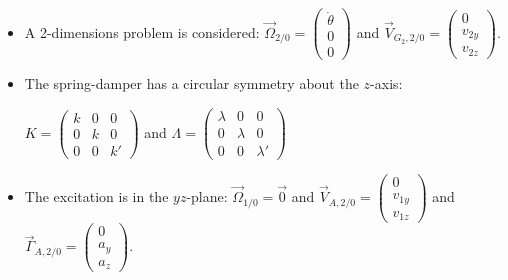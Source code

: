 \documentclass[\main/main.tex]{subfiles}
\begin{document}
\begin{itemize}

 \item A 2-dimensions problem is considered: $\overrightarrow{\Omega}_{2/0} =
       \begin{pmatrix}
        \dot{\theta} \\
        0            \\
        0
       \end{pmatrix}$ and $\overrightarrow{V}_{G_2, 2/0} =
       \begin{pmatrix}
        0      \\
        v_{2y} \\
        v_{2z}
       \end{pmatrix}$.

 \item The spring-damper has a circular symmetry about the $z$-axis:

       {\centering
        $K =
        \begin{pmatrix}
         k & 0 & 0  \\
         0 & k & 0  \\
         0 & 0 & k'
        \end{pmatrix}$ and $\Lambda =
        \begin{pmatrix}
         \lambda & 0       & 0        \\
         0       & \lambda & 0        \\
         0       & 0       & \lambda'
        \end{pmatrix}$
        \par}

 \item The excitation is in the $yz$-plane: $\overrightarrow{\Omega}_{1/0} = \overrightarrow{0}$ and $\overrightarrow{V}_{A, 2/0}
       =
       \begin{pmatrix}
        0      \\
        v_{1y} \\
        v_{1z}
       \end{pmatrix}$
       and $\overrightarrow{\Gamma}_{A, 2/0}
       =
       \begin{pmatrix}
        0      \\
        a_y \\
        a_z
       \end{pmatrix}$.


\end{itemize}
\end{document}
